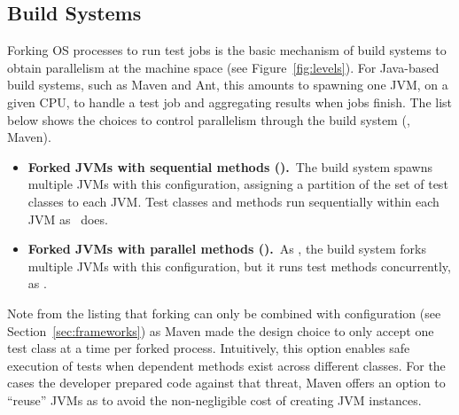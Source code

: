 \documentclass[10pt,journal,compsoc]{IEEEtran}
\begin{document}
\subsection{Build Systems}
\label{sec:builder}

Forking OS processes to run test jobs is the basic mechanism of build
systems to obtain parallelism at the machine space (see
Figure~\ref{fig:levels}).  For Java-based build systems, such as Maven
and Ant, this amounts to spawning one JVM, on a given CPU, to handle a
test job and aggregating results when jobs finish.  The list below
shows the choices to control parallelism through the build system
(\eg{}, Maven).

\begin{itemize}
\item
  \textbf{Forked JVMs with sequential methods (\ForkSeq).}~The build
  system spawns multiple JVMs with this configuration, assigning a
  partition of the set of test classes to each JVM.  Test classes and methods
  run sequentially within each JVM as \Seq\ does.
\item
  \textbf{Forked JVMs with parallel methods (\ForkParMeth).}~As
  \ForkSeq{}, the build system forks multiple JVMs with this
  configuration, but it runs test methods concurrently, as
  \SeqClassParMeth{}.
\end{itemize}


Note from the listing that forking can only be combined with
configuration \SeqClassParMeth{} (see Section~\ref{sec:frameworks}) as
Maven made the design choice to only accept one test class at a time
per forked process. Intuitively, this option enables safe execution of
tests when dependent methods exist across different classes. For the cases the developer prepared code against that
threat, Maven offers an option to ``reuse'' JVMs as to avoid the
non-negligible cost of creating JVM instances.
\end{document}
